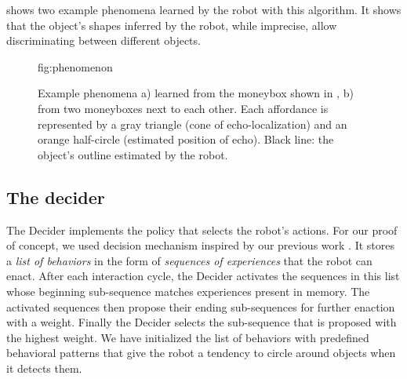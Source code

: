 \documentclass[pmlr]{jmlr}%
\begin{document}
 shows two example phenomena learned by the robot with this algorithm.  
It shows that the object's shapes inferred by the robot, while imprecise, allow discriminating between different objects.


\begin{figure}[htbp]
	\floatconts
	{fig:phenomenon}
	{\caption{Example phenomena a) learned from the moneybox shown in , b) from two moneyboxes next to each other.
	Each affordance is represented by a gray triangle (cone of echo-localization) and an orange half-circle (estimated position of echo).
	Black line: the object's outline estimated by the robot.}}
	{
	\qquad
	}
\end{figure}



\subsection{The decider}
\label{sec:decider}

The Decider implements the policy that selects the robot's actions. 
For our proof of concept, we used decision mechanism inspired by our previous work \citep{georgeon_eca_2013,robertson_biologically_2009}.
It stores a \textit{list of behaviors} in the form of \textit{sequences of experiences} that the robot can enact. 
After each interaction cycle, the Decider activates the sequences in this list whose beginning sub-sequence matches experiences present in memory. 
The activated sequences then propose their ending sub-sequences for further enaction with a weight. 
Finally the Decider selects the sub-sequence that is proposed with the highest weight. 
We have initialized the list of behaviors with predefined behavioral patterns that give the robot a tendency to circle around objects when it detects them. 
\end{document}
